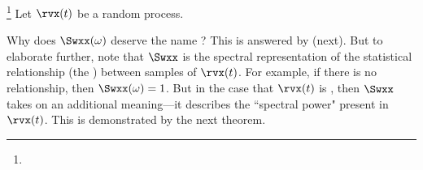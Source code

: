 \begin{definition}
\footnote{
  }
\label{def:Pavg}
Let $\rvx(t)$ be a  random process.
\end{definition}

\begin{remark}
\label{rem:spower}
Why does $\Swxx(\omega)$ deserve the name ?
This is answered by  (next).
But to elaborate further, note that $\Swxx$ is the spectral representation of 
the statistical relationship (the ) between samples of $\rvx(t)$. 
For example, if there is no relationship, then $\Swxx(\omega)=1$.
But in the case that $\rvx(t)$ is , then $\Swxx$ takes on 
an additional meaning---it describes the ``spectral power" present in $\rvx(t)$.
This is demonstrated by the next theorem.
\end{remark}

